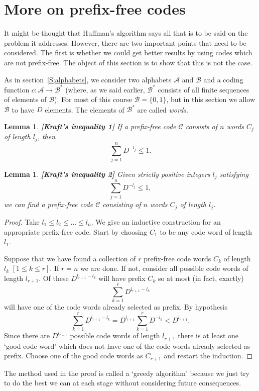 \documentclass[12pt,a4paper]{article}
\theoremstyle{plain}
\newtheorem{lemma}[theorem]{Lemma}
\theoremstyle{definition}
\begin{document}
    \section{More on prefix-free codes}\label{S;prefix}
    It might be thought that
    Huffman's algorithm says all that is to be said on
    the problem it addresses. However, there are two important
    points that need to be considered. The first is whether
    we could get better results by using codes which
    are not prefix-free. The object of this section is
    to show that this is not the case.

    As in section~\ref{S;alphabets},
    we consider two alphabets ${\mathcal A}$
    and ${\mathcal B}$
    and a coding function $c:{\mathcal A}\rightarrow{\mathcal B}^{*}$
    (where, as we said earlier,
    ${\mathcal B}^{*}$ consists of all finite sequences of
    elements of  ${\mathcal B}$). For most of this
    course ${\mathcal B}=\{0,1\}$, but in this section
    we allow ${\mathcal B}$ to have $D$ elements.
    The elements of ${\mathcal B}^{*}$ are called \emph{words}.

    \begin{lemma} {\bf [Kraft's inequality 1]}
        \label{Kraft 1}
        If a prefix-free code ${\mathcal C}$ consists
        of $n$ words $C_{j}$ of length $l_{j}$, then
        \[\sum_{j=1}^{n}D^{-l_{j}}\leq 1.\]
    \end{lemma}
    \begin{lemma} {\bf [Kraft's inequality 2]}
        \label{L;Kraft 2}
        Given strictly positive integers $l_{j}$ satisfying
        \[\sum_{j=1}^{n}D^{-l_{j}}\leq 1,\]
        we can find a prefix-free code ${\mathcal C}$ consisting
        of $n$ words $C_{j}$ of length $l_{j}$.
    \end{lemma}
    \begin{proof}
        Take $l_{1}\leq l_{2}\leq\dots\leq l_{n}$.
        We give an inductive construction for an appropriate
        prefix-free code. Start by choosing $C_{1}$ to be
        any code word of length $l_{1}$.

        Suppose that we have found a collection of $r$ prefix-free
        code words $C_{k}$ of length $l_{k}$ $[1\leq k\leq r]$.
        If $r=n$ we are done. If not, consider all
        possible code words
        of length $l_{r+1}$. Of these $D^{l_{r+1}-l_{k}}$ will
        have prefix $C_{k}$ so at most (in fact, exactly)
        \[\sum_{k=1}^{r}D^{l_{r+1}-l_{k}}\]
        will have one of the code words already selected as prefix.
        By hypothesis
        \[\sum_{k=1}^{r}D^{l_{r+1}-l_{k}}
        =D^{l_{r+1}}\sum_{k=1}^{r}D^{-l_{k}}<D^{l_{r+1}}.\]
        Since there are $D^{l_{r+1}}$ possible code words of length
        $l_{r+1}$ there is at least one `good code word'
        which does not
        have one of the code words already selected as prefix.
        Choose one of the good code words as $C_{r+1}$
        and restart the induction.
    \end{proof}
    The method used in the proof is called a `greedy algorithm'
    because we just try to do the best we can at each stage
    without considering future consequences.
\end{document}
